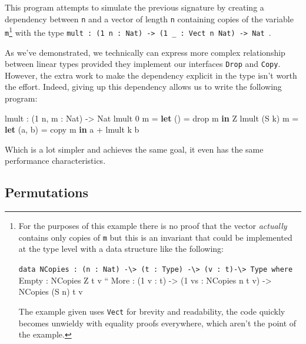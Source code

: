 \documentclass[
]{article}
\newenvironment{Shaded}{}{}
\newcommand{\DataTypeTok}[1]{\textcolor[rgb]{0.56,0.13,0.00}{#1}}
\newcommand{\DecValTok}[1]{\textcolor[rgb]{0.25,0.63,0.44}{#1}}
\newcommand{\FunctionTok}[1]{\textcolor[rgb]{0.02,0.16,0.49}{#1}}
\newcommand{\KeywordTok}[1]{\textcolor[rgb]{0.00,0.44,0.13}{\textbf{#1}}}
\newcommand{\NormalTok}[1]{#1}
\newcommand{\OperatorTok}[1]{\textcolor[rgb]{0.40,0.40,0.40}{#1}}
\newcommand{\OtherTok}[1]{\textcolor[rgb]{0.00,0.44,0.13}{#1}}
\begin{document}
This program attempts to simulate the previous signature by creating a
dependency between \texttt{n} and a vector of length \texttt{n}
containing copies of the variable \texttt{m}\footnote{For the purposes
  of this example there is no proof that the vector \emph{actually}
  contains only copies of \texttt{m} but this is an invariant that could
  be implemented at the type level with a data structure like the
  following:

  \texttt{data\ NCopies\ :\ (n\ :\ Nat)\ -\textbackslash{}\textgreater{}\ (t\ :\ Type)\ -\textbackslash{}\textgreater{}\ (v\ :\ t)-\textbackslash{}\textgreater{}\ Type\ where}
  Empty : NCopies Z t v `` More : (1 v : t) -\textgreater{} (1 vs :
  NCopies n t v) -\textgreater{} NCopies (S n) t v

  The example given uses \texttt{Vect} for brevity and readability, the
  code quickly becomes unwieldy with equality proofs everywhere, which
  aren't the point of the example.} with the type
\texttt{mult\ :\ (1\ n\ :\ Nat)\ -\textgreater{}\ (1\ \_\ :\ Vect\ n\ Nat)\ -\textgreater{}\ Nat~}.

As we've demonstrated, we technically can express more complex
relationship between linear types provided they implement our interfaces
\texttt{Drop} and \texttt{Copy}. However, the extra work to make the
dependency explicit in the type isn't worth the effort. Indeed, giving
up this dependency allows us to write the following program:

\begin{Shaded}
\begin{Highlighting}[]
\NormalTok{lmult }\OperatorTok{:}\NormalTok{ (}\DecValTok{1}\NormalTok{ n, m }\OperatorTok{:} \DataTypeTok{Nat}\NormalTok{) }\OtherTok{{-}\textgreater{}} \DataTypeTok{Nat}
\NormalTok{lmult }\DecValTok{0}\NormalTok{ m }\OtherTok{=} \KeywordTok{let}\NormalTok{ () }\OtherTok{=} \FunctionTok{drop}\NormalTok{ m }\KeywordTok{in} \DataTypeTok{Z}
\NormalTok{lmult (}\DataTypeTok{S}\NormalTok{ k) m }\OtherTok{=} \KeywordTok{let}\NormalTok{ (a, b) }\OtherTok{=}\NormalTok{ copy m }\KeywordTok{in}\NormalTok{ a }\OperatorTok{+}\NormalTok{ lmult k b}
\end{Highlighting}
\end{Shaded}

Which is a lot simpler and achieves the same goal, it even has the same
performance characteristics.

\hypertarget{permutations}{%
\subsection{Permutations}\label{permutations}}
\end{document}
